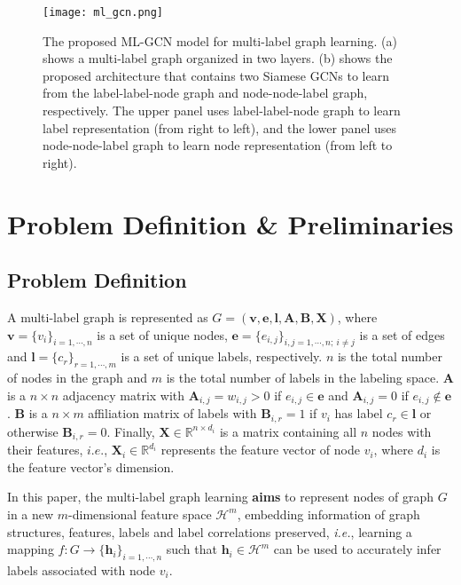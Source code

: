 \documentclass[conference]{IEEEtran}
\begin{document}
\begin{figure*}
  \centering
    \texttt{[image: ml\_gcn.png]}
  \caption{The proposed ML-GCN model for multi-label graph learning. (a) shows a multi-label graph organized in two layers. (b) shows the proposed architecture that contains two Siamese GCNs to learn from the label-label-node graph and node-node-label graph, respectively. The upper panel uses label-label-node graph to learn label representation (from right to left), and the lower panel uses node-node-label graph to learn node representation (from left to right).}
  \label{fig:mlgcn}
\end{figure*}

\section{Problem Definition \& Preliminaries}
\subsection{Problem Definition}
A multi-label graph is represented as $G=(\mathbf{v},\mathbf{e},\mathbf{l},\mathbf{A},\mathbf{B},\mathbf{X})$, where $\mathbf{v}=\{v_i\}_{i=1,\cdots,n}$ is a set of unique nodes, $\mathbf{e}=\{ e_{i,j} \}_{ {i,j}=1,\cdots,n;~i \neq j }$ is a set of edges and $\mathbf{l}=\{c_r\}_{r=1,\cdots,m}$ is a set of unique labels, respectively. $n$ is the total number of nodes in the graph and $m$ is the total number of labels in the labeling space. $\mathbf{A}$ is a $n \times n$ adjacency matrix with $\mathbf{A}_{i,j}=w_{i,j}>0$ if $e_{i,j}\in \mathbf{e}$ and $\mathbf{A}_{i,j}=0$ if $e_{i,j}\notin \mathbf{e}$. $\mathbf{B}$ is a $n \times m$ affiliation matrix of labels with $\mathbf{B}_{i,r}=1$ if $v_i$ has label $c_r \in \mathbf{l}$ or otherwise $\mathbf{B}_{i,r}=0$. Finally, $\mathbf{X} \in \mathbb{R}^{n \times d_i}$ is a matrix containing all $n$ nodes with their features, $i.e.$, $\mathbf{X}_i \in \mathbb{R}^{d_i}$ represents the feature vector of node $v_i$, where $d_i$ is the feature vector's dimension. 

In this paper, the multi-label graph learning \textbf{aims} to represent nodes of graph $G$ in a new $m$-dimensional feature space $\mathcal{H}^{m}$, embedding information of graph structures, features, labels and label correlations preserved, \textit{i.e.}, learning a mapping $f:G \rightarrow\{\mathbf{h}_i\}_{i=1,\cdots,n}$ such that $\mathbf{h}_i \in \mathcal{H}^{m}$ can be used to accurately infer labels associated with node $v_i$. 
\end{document}
